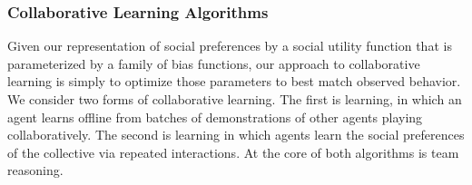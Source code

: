 
\subsubsection*{\large Collaborative Learning Algorithms}
\label{sec:learning}

Given our representation of social preferences by a social utility
function that is parameterized by a family of bias functions, our
approach to collaborative learning is simply to optimize those
parameters to best match observed behavior.  We consider two forms of
collaborative learning.  The first is  learning, in which
an agent learns offline from batches of demonstrations of other agents
playing collaboratively.  The second is  learning
in which agents learn the social preferences of the collective via
repeated interactions.
%
At the core of both algorithms is team reasoning.



